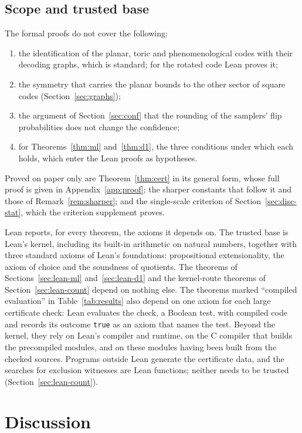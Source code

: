 \documentclass[11pt]{amsart}
\theoremstyle{definition}
\theoremstyle{remark}
\numberwithin{equation}{section}
\begin{document}
\subsection{Scope and trusted base}\label{sec:lean-trust}

The formal proofs do not cover the following:
\begin{enumerate}[label=(\roman*),leftmargin=2em]
\item the identification of the planar, toric and phenomenological codes with their decoding graphs, which is standard; for the rotated code Lean proves it;
\item the symmetry that carries the planar bounds to the other sector of square codes (Section~\ref{sec:graphs});
\item the argument of Section~\ref{sec:conf} that the rounding of the samplers' flip probabilities does not change the confidence;
\item for Theorems~\ref{thm:ml} and~\ref{thm:d1}, the three conditions under which each holds, which enter the Lean proofs as hypotheses.
\end{enumerate}
Proved on paper only are Theorem~\ref{thm:cert} in its general form, whose full proof is given in Appendix~\ref{app:proof}; the sharper constants that follow it and those of Remark~\ref{rem:sharper}; and the single-scale criterion of Section~\ref{sec:disc-stat}, which the criterion supplement proves.

Lean reports, for every theorem, the axioms it depends on. The trusted base is Lean's kernel, including its built-in
arithmetic on natural numbers, together with three standard axioms of Lean's foundations: propositional
extensionality, the axiom of choice and the soundness of quotients. The theorems of Sections~\ref{sec:lean-ml} and~\ref{sec:lean-d1} and the
kernel-route theorems of Section~\ref{sec:lean-count} depend on nothing else. The theorems marked ``compiled
evaluation'' in Table~\ref{tab:results} also depend on one axiom for each large certificate check: Lean evaluates the
check, a Boolean test, with compiled code and records its outcome \texttt{true} as an axiom that names the test.
Beyond the kernel, they rely on Lean's compiler and runtime, on the C compiler that
builds the precompiled modules, and on these modules having been built from the checked sources. Programs outside Lean
generate the certificate data, and the searches for exclusion witnesses are Lean functions; neither needs to be trusted
(Section~\ref{sec:lean-count}).

\section{Discussion}\label{sec:discussion}
\end{document}
